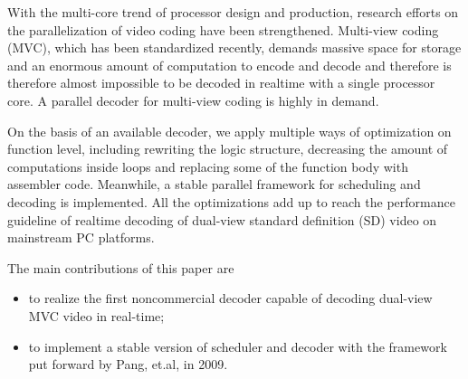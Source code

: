 \begin{eabstract} 

With the multi-core trend of processor design and production, research efforts on the parallelization of video coding have been strengthened. Multi-view coding (MVC), which has been standardized recently, demands massive space for storage and an enormous amount of computation to encode and decode and therefore is therefore almost impossible to be decoded in realtime with a single processor core. A parallel decoder for multi-view coding is highly in demand.

On the basis of an available decoder, we apply multiple ways of optimization on function level, including rewriting the logic structure, decreasing the amount of computations inside loops and replacing some of the function body with assembler code. Meanwhile, a stable parallel framework for scheduling and decoding is implemented. All the optimizations add up to reach the performance guideline of realtime decoding of dual-view standard definition (SD) video on mainstream PC platforms.

The main contributions of this paper are
\begin{itemize}
\item to realize the first noncommercial decoder capable of decoding dual-view MVC video in real-time;
\item to implement a stable version of scheduler and decoder with the framework\cite{pang2009framework} put forward by Pang, et.al, in 2009.
\end{itemize}

\end{eabstract}

